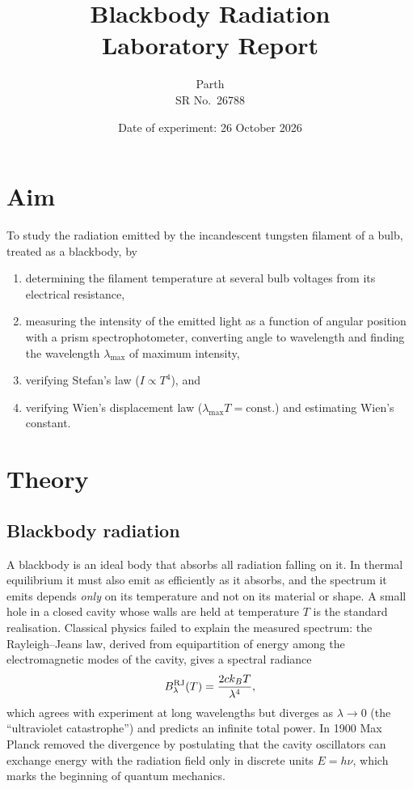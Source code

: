 \documentclass[11pt,a4paper]{article}
\title{\textbf{Blackbody Radiation}\\[2pt]\large Laboratory Report}
\author{Parth\\SR No.\ 26788}
\date{Date of experiment: 26 October 2026}
\begin{document}
\maketitle

\section{Aim}
To study the radiation emitted by the incandescent tungsten filament of a bulb, treated as a blackbody, by
\begin{enumerate}
  \item determining the filament temperature at several bulb voltages from its electrical resistance,
  \item measuring the intensity of the emitted light as a function of angular position with a prism spectrophotometer, converting angle to wavelength and finding the wavelength $\lambda_{\max}$ of maximum intensity,
  \item verifying Stefan's law ($I\propto T^{4}$), and
  \item verifying Wien's displacement law ($\lambda_{\max}T=\text{const.}$) and estimating Wien's constant.
\end{enumerate}

\section{Theory}

\subsection{Blackbody radiation}
A blackbody is an ideal body that absorbs all radiation falling on it. In thermal equilibrium it must also emit as efficiently as it absorbs, and the spectrum it emits depends \emph{only} on its temperature and not on its material or shape. A small hole in a closed cavity whose walls are held at temperature $T$ is the standard realisation. Classical physics failed to explain the measured spectrum: the Rayleigh--Jeans law, derived from equipartition of energy among the electromagnetic modes of the cavity, gives a spectral radiance
\begin{equation}
  B_\lambda^{\rm RJ}(T)=\frac{2ck_BT}{\lambda^{4}},
\end{equation}
which agrees with experiment at long wavelengths but diverges as $\lambda\to0$ (the ``ultraviolet catastrophe'') and predicts an infinite total power. In 1900 Max Planck removed the divergence by postulating that the cavity oscillators can exchange energy with the radiation field only in discrete units $E=h\nu$, which marks the beginning of quantum mechanics.
\end{document}
